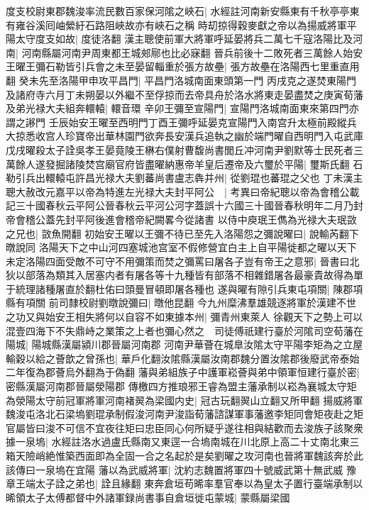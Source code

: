 度支校尉東郡魏浚率流民數百家保河隂之峽石|{
	水經註河南新安縣東有千秋亭亭東有雍谷溪囘岫縈紆石路阻峽故亦有峽石之稱}
時刧掠得穀麥獻之帝以為揚威將軍平陽太守度支如故|{
	度徒洛翻}
漢主聰使前軍大將軍呼延晏將兵二萬七千寇洛陽比及河南|{
	河南縣屬河南尹周東都王城郟鄏也比必寐翻}
晉兵前後十二敗死者三萬餘人始安王曜王彌石勒皆引兵會之未至晏留輜重於張方故壘|{
	張方故壘在洛陽西七里重直用翻}
癸未先至洛陽甲申攻平昌門|{
	平昌門洛城南面東頭第一門}
丙戌克之遂焚東陽門及諸府寺六月丁未朔晏以外繼不至俘掠而去帝具舟於洛水將東走晏盡焚之庚寅荀藩及弟光禄大夫組奔轘轅|{
	轘音環}
辛卯王彌至宣陽門|{
	宣陽門洛城南面東來第四門亦謂之謻門}
壬辰始安王曜至西明門丁酉王彌呼延晏克宣陽門入南宫升太極前殿縱兵大掠悉收宫人珍寶帝出華林園門欲奔長安漢兵追執之幽於端門曜自西明門入屯武庫戊戌曜殺太子詮吳孝王晏竟陵王楙右僕射曹馥尚書閭丘冲河南尹劉默等士民死者三萬餘人遂發掘諸陵焚宫廟官府皆盡曜納惠帝羊皇后遷帝及六璽於平陽|{
	璽斯氏翻}
石勒引兵出轘轅屯許昌光禄大夫劉蕃尚書盧志犇并州|{
	從劉琨也蕃琨之父也}
丁未漢主聰大赦改元嘉平以帝為特進左光禄大夫封平阿公　|{
	考異曰帝紀聰以帝為會稽公載記三十國春秋云平阿公晉春秋云平河公河字蓋誤十六國三十國晉春秋明年二月乃封帝會稽公蓋先封平阿後進會稽帝紀闕畧今從諸書}
以侍中庾珉王儁為光禄大夫珉敳之兄也|{
	敳魚開翻}
初始安王曜以王彌不待已至先入洛陽怨之彌說曜曰|{
	說輸芮翻下暾說同}
洛陽天下之中山河四塞城池宫室不假修營宜白主上自平陽徙都之曜以天下未定洛陽四面受敵不可守不用彌策而焚之彌罵曰屠各子豈有帝王之意邪|{
	晉書曰北狄以部落為類其入居塞内者有屠各等十九種皆有部落不相雜錯屠各最豪貴故得為單于統理諸種屠直於翻杜佑曰頭曼冒頓即屠各種也}
遂與曜有隙引兵東屯項關|{
	陳郡項縣有項關}
前司隸校尉劉暾說彌曰|{
	暾他昆翻}
今九州糜沸羣雄競逐將軍於漢建不世之功又與始安王相失將何以自容不如東據本州|{
	彌青州東萊人}
徐觀天下之勢上可以混壹四海下不失鼎峙之業策之上者也彌心然之　司徒傅祇建行臺於河隂司空荀藩在陽城|{
	陽城縣漢屬潁川郡晉屬河南郡}
河南尹華薈在城臯汝隂太守平陽李矩為之立屋輸穀以給之薈歆之曾孫也|{
	華戶化翻汝隂縣漢屬汝南郡魏分置汝隂郡後廢武帝泰始二年復為郡薈烏外翻為于偽翻}
藩與弟組族子中護軍崧薈與弟中領軍恒建行臺於密|{
	密縣漢屬河南郡晉屬滎陽郡}
傳檄四方推琅邪王睿為盟主藩承制以崧為襄城太守矩為滎陽太守前冠軍將軍河南褚翜為梁國内史|{
	冠古玩翻翜山立翻又所甲翻}
揚威將軍魏浚屯洛北石梁塢劉琨承制假浚河南尹浚詣荀藩諮謀軍事藩邀李矩同會矩夜赴之矩官屬皆曰浚不可信不宜夜往矩曰忠臣同心何所疑乎遂往相與結歡而去浚族子該聚衆據一泉塢|{
	水經註洛水過盧氏縣南又東逕一合塢南城在川北原上高二十丈南北東三箱天險峭絶惟築西面即為全固一合之名起於是矣劉曜之攻河南也晉將軍魏該奔於此該傳曰一泉塢在宜陽}
藩以為武威將軍|{
	沈約志魏置將軍四十號威武第十無武威}
豫章王端太子詮之弟也|{
	詮且緣翻}
東奔倉垣苟晞率羣官奉以為皇太子置行臺端承制以晞領太子太傅都督中外諸軍録尚書事自倉垣徙屯蒙城|{
	蒙縣屬梁國}
